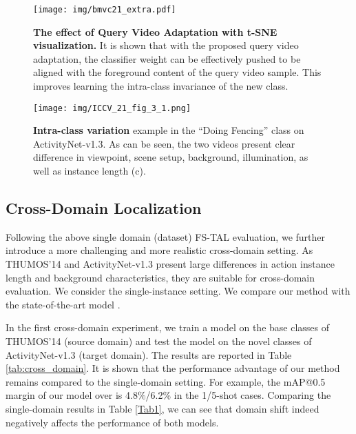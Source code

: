\documentclass{bmvc2k}
\begin{document}
\begin{figure*}[]
\begin{center}
  \texttt{[image: img/bmvc21\_extra.pdf]}
\end{center}
\caption{\textbf{The effect of Query Video Adaptation with t-SNE visualization.} 
It is shown that with the proposed query video adaptation,
the classifier weight can be effectively pushed to be aligned with the foreground content of the query video sample.
This improves learning the intra-class invariance of the new class.
}
\vspace{-0.2in}
\label{fig:tsne}
\end{figure*}


\begin{figure}[h]
\begin{center}
  \texttt{[image: img/ICCV\_21\_fig\_3\_1.png]}
\end{center}
\caption{\textbf{Intra-class variation} example in 
the ``Doing Fencing'' class
on ActivityNet-v1.3. 
As can be seen, the two videos present clear difference
in viewpoint, scene setup, background, illumination,
as well as instance length (c).
}
\label{fig:intra_class}
\end{figure}
\vspace{-0.2in}
\subsection{Cross-Domain Localization} 
Following the above single domain (dataset) FS-TAL evaluation,
we further introduce a more challenging and more realistic cross-domain setting. 
As THUMOS'14 and ActivityNet-v1.3 present large differences in action instance length and background characteristics, they are suitable for cross-domain evaluation.
We consider the single-instance setting.
We compare our method with the state-of-the-art model \cite{yang2020localizing}.






\noindent {\bf  }
In the first cross-domain experiment, we train a model on the base classes of THUMOS'14 (source domain) and test the model on the novel classes of ActivityNet-v1.3 (target domain). 
The results are reported in Table \ref{tab:cross_domain}.
It is shown that the performance advantage of our method 
remains compared to the single-domain setting.
For example, the mAP@0.5 margin of our model over \cite{yang2020localizing} is 4.8\%/6.2\%
in the 1/5-shot cases.
Comparing the single-domain results in Table \ref{Tab1},
we can see that domain shift indeed negatively affects
the performance of both models.
\end{document}
